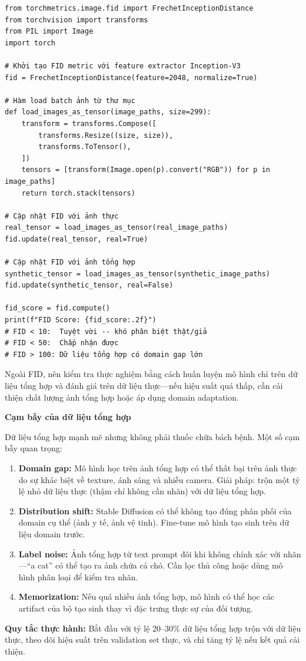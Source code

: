 \begin{verbatim}
from torchmetrics.image.fid import FrechetInceptionDistance
from torchvision import transforms
from PIL import Image
import torch

# Khởi tạo FID metric với feature extractor Inception-V3
fid = FrechetInceptionDistance(feature=2048, normalize=True)

# Hàm load batch ảnh từ thư mục
def load_images_as_tensor(image_paths, size=299):
    transform = transforms.Compose([
        transforms.Resize((size, size)),
        transforms.ToTensor(),
    ])
    tensors = [transform(Image.open(p).convert("RGB")) for p in image_paths]
    return torch.stack(tensors)

# Cập nhật FID với ảnh thực
real_tensor = load_images_as_tensor(real_image_paths)
fid.update(real_tensor, real=True)

# Cập nhật FID với ảnh tổng hợp
synthetic_tensor = load_images_as_tensor(synthetic_image_paths)
fid.update(synthetic_tensor, real=False)

fid_score = fid.compute()
print(f"FID Score: {fid_score:.2f}")
# FID < 10:  Tuyệt vời -- khó phân biệt thật/giả
# FID < 50:  Chấp nhận được
# FID > 100: Dữ liệu tổng hợp có domain gap lớn
\end{verbatim}

Ngoài FID, nên kiểm tra thực nghiệm bằng cách huấn luyện mô hình chỉ trên dữ liệu tổng hợp và đánh giá trên dữ liệu thực---nếu hiệu suất quá thấp, cần cải thiện chất lượng ảnh tổng hợp hoặc áp dụng domain adaptation.

\begin{mdframed}[style=infobox]
\textbf{Cạm bẫy của dữ liệu tổng hợp}

Dữ liệu tổng hợp mạnh mẽ nhưng không phải thuốc chữa bách bệnh. Một số cạm bẫy quan trọng:

\begin{enumerate}
    \item \textbf{Domain gap:} Mô hình học trên ảnh tổng hợp có thể thất bại trên ảnh thực do sự khác biệt về texture, ánh sáng và nhiễu camera. Giải pháp: trộn một tỷ lệ nhỏ dữ liệu thực (thậm chí không cần nhãn) với dữ liệu tổng hợp.

    \item \textbf{Distribution shift:} Stable Diffusion có thể không tạo đúng phân phối của domain cụ thể (ảnh y tế, ảnh vệ tinh). Fine-tune mô hình tạo sinh trên dữ liệu domain trước.

    \item \textbf{Label noise:} Ảnh tổng hợp từ text prompt đôi khi không chính xác với nhãn---``a cat'' có thể tạo ra ảnh chứa cả chó. Cần lọc thủ công hoặc dùng mô hình phân loại để kiểm tra nhãn.

    \item \textbf{Memorization:} Nếu quá nhiều ảnh tổng hợp, mô hình có thể học các artifact của bộ tạo sinh thay vì đặc trưng thực sự của đối tượng.
\end{enumerate}

\textbf{Quy tắc thực hành:} Bắt đầu với tỷ lệ 20--30\% dữ liệu tổng hợp trộn với dữ liệu thực, theo dõi hiệu suất trên validation set thực, và chỉ tăng tỷ lệ nếu kết quả cải thiện.
\end{mdframed}
